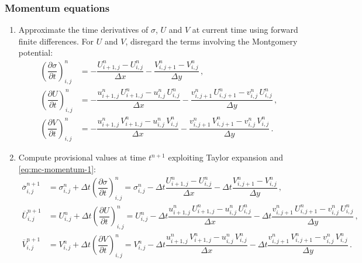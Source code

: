 \documentclass{article}
\numberwithin{equation}{section}
\begin{document}
	\subsubsection{Momentum equations}
		\begin{enumerate}
			\label{point}
			\item Approximate the time derivatives of $\sigma$, $U$ and $V$ at current time using forward finite differences. For $U$ and $V$, disregard the terms involving the Montgomery potential:
				\begin{subequations}
					\label{eq:mc-momentum-1}
					\begin{align}
						\left( \dfrac{\partial \sigma}{\partial t} \right)_{i,j}^n & = - \dfrac{U_{i+1,j}^n - U_{i,j}^n}{\Delta x} - \dfrac{V_{i,j+1}^n - V_{i,j}^n}{\Delta y} \, , \\
						\label{eq:mc-momentum-1-2}
						\left( \dfrac{\partial U}{\partial t} \right)_{i,j}^n & = - \dfrac{u_{i+1,j}^n \, U_{i+1,j}^n - u_{i,j}^n \, U_{i,j}^n}{\Delta x} - \dfrac{v_{i,j+1}^n \, U_{i,j+1}^n - v_{i,j}^n \, U_{i,j}^n}{\Delta y} \, , \\
						\label{eq:mc-momentum-1-3}
						\left( \dfrac{\partial V}{\partial t} \right)_{i,j}^n & = - \dfrac{u_{i+1,j}^n \, V_{i+1,j}^n - u_{i,j}^n \, V_{i,j}^n}{\Delta x} - \dfrac{v_{i,j+1}^n \, V_{i,j+1}^n - v_{i,j}^n \, V_{i,j}^n}{\Delta y} \, .
					\end{align}
				\end{subequations}
			\item Compute provisional values at time $t^{n+1}$ exploiting Taylor expansion and \eqref{eq:mc-momentum-1}:
				\begin{subequations}
					\label{eq:mc-momentum-2}
					\begin{align}
						\label{eq:mc-momentum-2-1}
						\overline{\sigma}_{i,j}^{n+1} & = \sigma_{i,j}^n + \Delta t \left( \dfrac{\partial \sigma}{\partial t} \right)_{i,j}^n = \sigma_{i,j}^n - \Delta t \dfrac{U_{i+1,j}^n - U_{i,j}^n}{\Delta x} - \Delta t \dfrac{V_{i,j+1}^n - V_{i,j}^n}{\Delta y} \, , \\
						\label{eq:mc-momentum-2-2}
						\overline{U}_{i,j}^{n+1} & = U_{i,j}^n + \Delta t \left( \dfrac{\partial U}{\partial t} \right)_{i,j}^n = U_{i,j}^n - \Delta t \dfrac{u_{i+1,j}^n \, U_{i+1,j}^n - u_{i,j}^n \, U_{i,j}^n}{\Delta x} - \Delta t \dfrac{v_{i,j+1}^n \, U_{i,j+1}^n - v_{i,j}^n \, U_{i,j}^n}{\Delta y} \, , \\
						\label{eq:mc-momentum-2-3}
						\overline{V}_{i,j}^{n+1} & = V_{i,j}^n + \Delta t \left( \dfrac{\partial V}{\partial t} \right)_{i,j}^n = V_{i,j}^n - \Delta t \dfrac{u_{i+1,j}^n \, V_{i+1,j}^n - u_{i,j}^n \, V_{i,j}^n}{\Delta x} - \Delta t \dfrac{v_{i,j+1}^n \, V_{i,j+1}^n - v_{i,j}^n \, V_{i,j}^n}{\Delta y} \, .

\end{align}
\end{subequations}
\end{enumerate}
\end{document}
